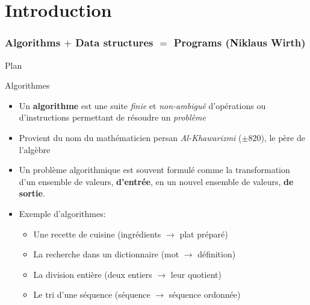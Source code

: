
\part{Introduction}

\section{Algorithms $+$ Data structures $=$ Programs (\footnotesize{Niklaus Wirth})}

\begin{frame}{Plan}

\tableofcontents

\end{frame}

\begin{frame}{Algorithmes}

\begin{itemize}
\item Un {\bf algorithme} est une suite {\em finie} et {\em non-ambiguë} d'opérations ou d'instructions permettant de résoudre un {\em problème}
\item Provient du nom du mathématicien persan {\em Al-Khawarizmi}
  ($\pm 820$), le père de l'algèbre
\item Un problème algorithmique est souvent formulé comme la
  transformation d'un ensemble de valeurs, {\bf d'entrée}, en un
  nouvel ensemble de valeurs, {\bf de sortie}.
\item Exemple d'algorithmes:
\begin{itemize}
\item Une recette de cuisine (ingrédients $\rightarrow$ plat préparé)
\item La recherche dans un dictionnaire (mot $\rightarrow$ définition)
\item La division entière (deux entiers $\rightarrow$ leur quotient)
\item Le tri d'une séquence (séquence $\rightarrow$ séquence ordonnée)

\end{itemize}
\end{itemize}

\end{frame}


